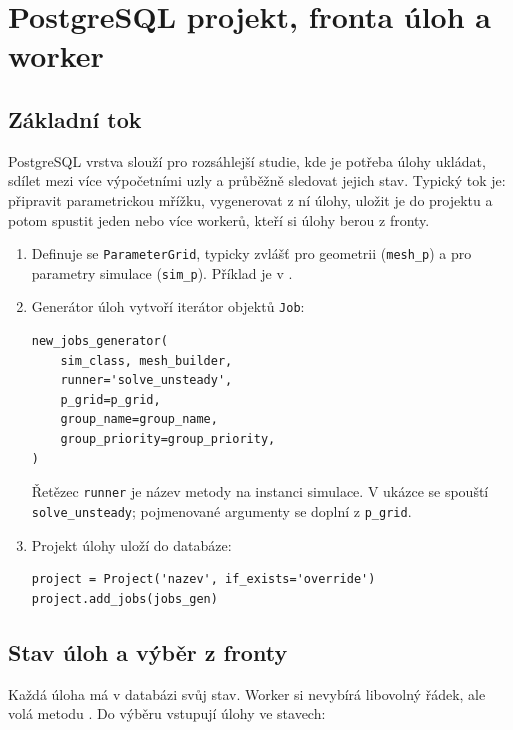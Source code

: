 \documentclass[a4paper,11pt]{article}
\begin{document}
\section{PostgreSQL projekt, fronta úloh a worker}\label{sec:pg}

\subsection*{Základní tok}

PostgreSQL vrstva slouží pro rozsáhlejší studie, kde je potřeba úlohy ukládat,
sdílet mezi více výpočetními uzly a průběžně sledovat jejich stav. Typický tok
je: připravit parametrickou mřížku, vygenerovat z ní úlohy, uložit je do projektu
a potom spustit jeden nebo více workerů, kteří si úlohy berou z fronty.

\begin{enumerate}
  \item Definuje se \texttt{ParameterGrid}, typicky zvlášť pro geometrii
        (\texttt{mesh\_p}) a pro parametry simulace (\texttt{sim\_p}). Příklad
        je v .
  \item Generátor úloh vytvoří iterátor objektů \texttt{Job}:

\begin{lstlisting}[style=py]
new_jobs_generator(
    sim_class, mesh_builder,
    runner='solve_unsteady',
    p_grid=p_grid,
    group_name=group_name,
    group_priority=group_priority,
)
\end{lstlisting}

        Řetězec \texttt{runner} je název metody na instanci simulace. V ukázce
        se spouští \texttt{solve\_unsteady}; pojmenované argumenty se doplní z
        \texttt{p\_grid}.
  \item Projekt úlohy uloží do databáze:

\begin{lstlisting}[style=py]
project = Project('nazev', if_exists='override')
project.add_jobs(jobs_gen)
\end{lstlisting}
\end{enumerate}

\subsection*{Stav úloh a výběr z fronty}

Každá úloha má v databázi svůj stav. Worker si nevybírá libovolný řádek, ale
volá metodu . Do výběru vstupují úlohy ve
stavech:
\end{document}
